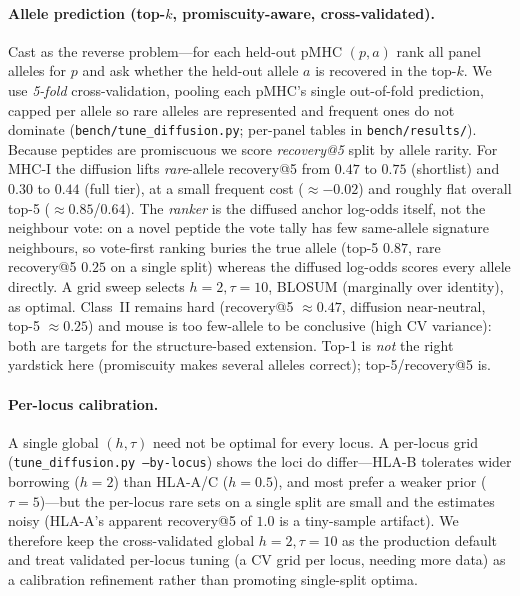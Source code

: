 \documentclass[11pt]{article}
\theoremstyle{oldplain}
\theoremstyle{oldrem}
\begin{document}
\paragraph{Allele prediction (top-$k$, promiscuity-aware, cross-validated).} Cast as the reverse
problem---for each held-out pMHC $(p,a)$ rank all panel alleles for $p$ and ask whether the held-out
allele $a$ is recovered in the top-$k$. We use \emph{5-fold} cross-validation, pooling each pMHC's
single out-of-fold prediction, capped per allele so rare alleles are represented and frequent ones
do not dominate (\texttt{bench/tune\_diffusion.py}; per-panel tables in \texttt{bench/results/}).
Because peptides are promiscuous we score \emph{recovery@5} split by allele rarity. For MHC-I the
diffusion lifts \emph{rare}-allele recovery@5 from $0.47$ to $0.75$ (shortlist) and $0.30$ to $0.44$
(full tier), at a small frequent cost ($\approx-0.02$) and roughly flat overall top-5
($\approx0.85$/$0.64$). The \emph{ranker} is the diffused anchor log-odds itself, not the neighbour
vote: on a novel peptide the vote tally has few same-allele signature neighbours, so vote-first
ranking buries the true allele (top-5 $0.87$, rare recovery@5 $0.25$ on a single split) whereas the
diffused log-odds scores every allele directly. A grid sweep selects $h=2,\tau=10$, BLOSUM
(marginally over identity), as optimal. Class~II remains hard (recovery@5 $\approx0.47$, diffusion
near-neutral, top-5 $\approx0.25$) and mouse is too few-allele to be conclusive (high CV variance):
both are targets for the structure-based extension. Top-1 is \emph{not} the right yardstick here
(promiscuity makes several alleles correct); top-5/recovery@5 is.

\paragraph{Per-locus calibration.} A single global $(h,\tau)$ need not be optimal for every locus.
A per-locus grid (\texttt{tune\_diffusion.py --by-locus}) shows the loci do differ---HLA-B tolerates
wider borrowing ($h{=}2$) than HLA-A/C ($h{=}0.5$), and most prefer a weaker prior ($\tau{=}5$)---but
the per-locus rare sets on a single split are small and the estimates noisy (HLA-A's apparent
recovery@5 of $1.0$ is a tiny-sample artifact). We therefore keep the cross-validated global
$h{=}2,\tau{=}10$ as the production default and treat validated per-locus tuning (a CV grid per locus,
needing more data) as a calibration refinement rather than promoting single-split optima.
\end{document}
